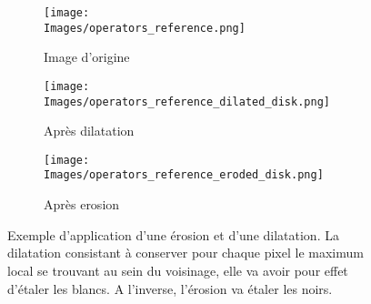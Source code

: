 \documentclass[\main/main.tex]{subfiles}
\providecommand{\Images}{\main/Figures/intro_seg}
\begin{document}
\begin{figure}[h]
    \centering
    \begin{subfigure}[b]{0.30\textwidth}
       \caption{
       Image d'origine
            }
       \centering \texttt{[image: \\Images/operators\_reference.png]}
    \end{subfigure}
    \begin{subfigure}[b]{0.30\textwidth}
       \caption{
            Après dilatation
            }
       \centering \texttt{[image: \\Images/operators\_reference\_dilated\_disk.png]}
    \end{subfigure}
    \begin{subfigure}[b]{0.30\textwidth}
       \caption{
            Après erosion
            }
       \centering \texttt{[image: \\Images/operators\_reference\_eroded\_disk.png]}
    \end{subfigure}
    \caption{
        \label{fig:morpho:operateurs}
        Exemple d'application d'une érosion et d'une dilatation.\newline
        La dilatation consistant à conserver pour chaque pixel le maximum local se trouvant au sein du voisinage, elle va avoir pour effet d'étaler les blancs. A l'inverse, l'érosion va étaler les noirs.
    }
    
\end{figure}
\end{document}
